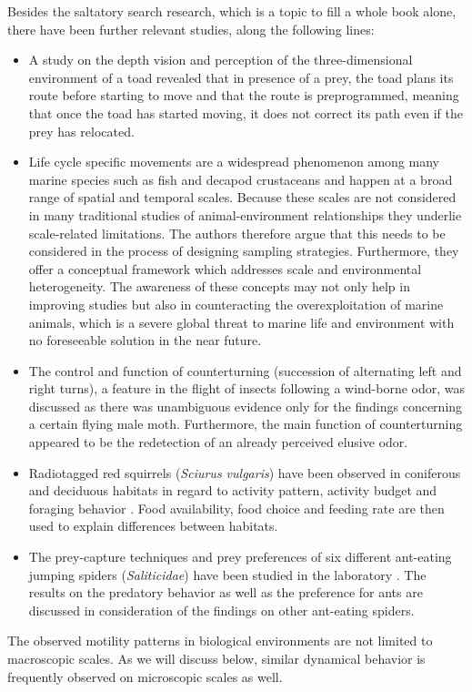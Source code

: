 Besides the saltatory search research, which is a topic to fill a whole book alone, there have been further relevant studies, \eg along the following lines:
\begin{itemize}
 \item A study on the depth vision and perception of the three-dimensional environment of a toad \cite{lock:1979} revealed that in presence of a prey, the toad plans its route before starting to move and that the route is preprogrammed, meaning that once the toad has started moving, it does not correct its path even if the prey has relocated.
 \item Life cycle specific movements are a widespread phenomenon among many marine species \cite{pittman:2003} such as fish and decapod crustaceans and happen at a broad range of spatial and temporal scales. Because these scales are not considered in many traditional studies of animal-environment relationships they underlie scale-related limitations. The authors therefore argue that this needs to be considered in the process of designing sampling strategies. Furthermore, they offer a conceptual framework which addresses scale and environmental heterogeneity. The awareness of these concepts may not only help in improving studies but also in counteracting the overexploitation of marine animals, which is a severe global threat to marine life and environment with no foreseeable solution in the near future.
 \item The control and function of counterturning (succession of alternating left and right turns), a feature in the flight of insects following a wind-borne odor, was discussed \cite{kennedy:1983} as there was unambiguous evidence only for the findings concerning a certain flying male moth. Furthermore, the main function of counterturning appeared to be the redetection of an already perceived elusive odor.
 \item Radiotagged red squirrels (\textit{Sciurus vulgaris}) have been observed in coniferous and deciduous habitats in regard to activity pattern, activity budget and foraging behavior \cite{wauters:1992}. Food availability, food choice and feeding rate are then used to explain differences between habitats.
 \item The prey-capture techniques and prey preferences of six different ant-eating jumping spiders (\textit{Saliticidae}) have been studied in the laboratory \cite{jackson:1992}. The results on the predatory behavior as well as the preference for ants are discussed in consideration of the findings on other ant-eating spiders.
\end{itemize}
The observed motility patterns in biological environments are not limited to macroscopic scales. As we will discuss below, similar dynamical behavior is frequently observed on microscopic scales as well.

